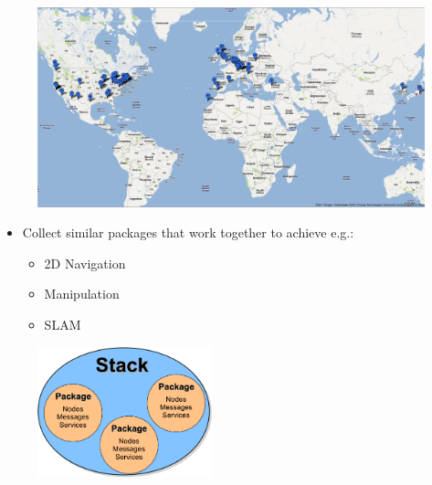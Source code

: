 \lyxframeend{}


\lyxframeend{}

\noindent \begin{center}
\begin{figure}[H]
\noindent \centering{}\includegraphics[bb=80bp 0bp 1350bp 550bp,width=1\paperwidth]{images/ROS_Repositories}
\end{figure}

\par\end{center}


\lyxframeend{}


\lyxframeend{}
\begin{itemize}
\item Collect similar packages that work together to achieve e.g.:

\begin{itemize}
\item 2D Navigation
\item Manipulation
\item SLAM
\end{itemize}
\end{itemize}
\noindent \begin{center}
\begin{figure}[H]
\noindent \centering{}\includegraphics[width=0.45\textwidth]{images/ROSStack}
\end{figure}

\par\end{center}


